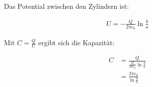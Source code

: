 \documentclass[a4paper,german,12pt,smallheadings]{scrartcl}
\begin{document}
Das Potential zwischen den Zylindern ist:

\begin{align*}
  U = -\frac{Q}{2 \pi \epsilon_0} \ln \frac{b}{a}
\end{align*}

Mit $C = \frac{Q}{U}$ ergibt sich die Kapazität:

\begin{align*}
  C &= \frac{Q}{\frac{Q}{2 \pi \epsilon_0} \ln \frac{b}{a}} \\
    &= \frac{2 \pi \epsilon_0}{\ln \frac{b}{a}}
\end{align*}
\end{document}
